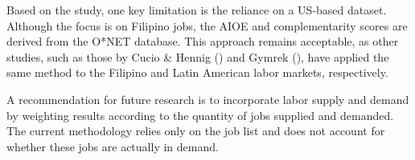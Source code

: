 Based on the study, one key limitation is the reliance on a US-based dataset.
Although the focus is on Filipino jobs, the AIOE and complementarity scores are derived from the O*NET database.
This approach remains acceptable, as other studies, such as those by Cucio \& Hennig (\citeyear{cucio2025}) and Gymrek (\citeyear{gmyrek2024}), have applied the same method to the Filipino and Latin American labor markets, respectively.

A recommendation for future research is to incorporate labor supply and demand by weighting results according to the quantity of jobs supplied and demanded. The current methodology relies only on the job list and does not account for whether these jobs are actually in demand.